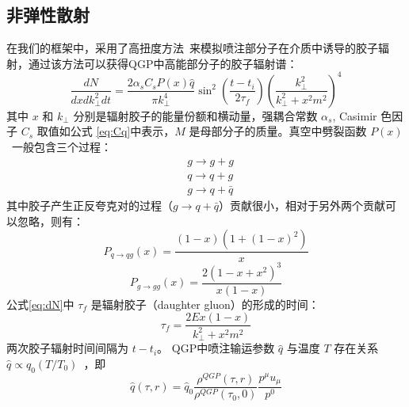 \subsection{非弹性散射}
在我们的框架中，采用了高扭度方法~\parencite{Guo:2000nz,Zhang:2003yn,Zhang:2004qm,Majumder:2009ge}来模拟喷注部分子在介质中诱导的胶子辐射，通过该方法可以获得QGP中高能部分子的胶子辐射谱：
  \begin{equation}
  	\frac{d N}{d x d k_{\perp}^2 d t}=\frac{2 \alpha_s C_s P(x) \hat{q}}{\pi k_{\perp}^4} \sin ^2\left(\frac{t-t_i}{2 \tau_f}\right)\left(\frac{k_{\perp}^2}{k_{\perp}^2+x^2 m^2}\right)^4
  	\label{eq:dN}
  \end{equation}
  其中 $x$ 和 $k_\perp$ 分别是辐射胶子的能量份额和横动量，强耦合常数 $\alpha_s$, Casimir 色因子 $C_s$ 取值如公式 \ref{eq:Cq}中表示，$M$ 是母部分子的质量。真空中劈裂函数 $P(x)$ ~\parencite{Deng:2009ncl}一般包含三个过程：
  \begin{equation*}
  	\begin{aligned}
  	& g \to g+g \\
  	& q \to q+g \\
  	& g \to q + \bar{q}
  	\end{aligned}
  	\label{eq:gqg}
  \end{equation*}
  其中胶子产生正反夸克对的过程（$g \to q + \bar{q}$）贡献很小，相对于另外两个贡献可以忽略，则有：
  \begin{equation}
    P_{q \rightarrow q g}(x)=\frac{(1-x)\left(1+(1-x)^2\right)}{x}
  	\label{eq:ggg}
  \end{equation}
  \begin{equation}
	P_{g \rightarrow g g}(x)=\frac{2\left(1-x+x^2\right)^3}{x(1-x)}
  	\label{eq:qqg}
  \end{equation}
  公式\ref{eq:dN}中 $\tau_f$ 是辐射胶子（daughter gluon）的形成的时间：
   \begin{equation}
  	  \tau_f = \frac{2Ex(1-x)}{k_\perp^2 + x^2m^2}
  	\label{eq:tau_f}
  \end{equation}
  两次胶子辐射时间间隔为 $t - t_i$。
  QGP中喷注输运参数 $\hat{q}$ 与温度 $T$ 存在关系 $\hat{q} \propto q_0(T/T_0)$~\parencite{Chen:2010te}，即
  \begin{equation}
  	\hat{q}(\tau, r)=\hat{q}_0 \frac{\rho^{Q G P}(\tau, r)}{\rho^{Q G P}\left(\tau_0, 0\right)} \frac{p^\mu u_\mu}{p^0}
  	\label{qhat}
  \end{equation}

